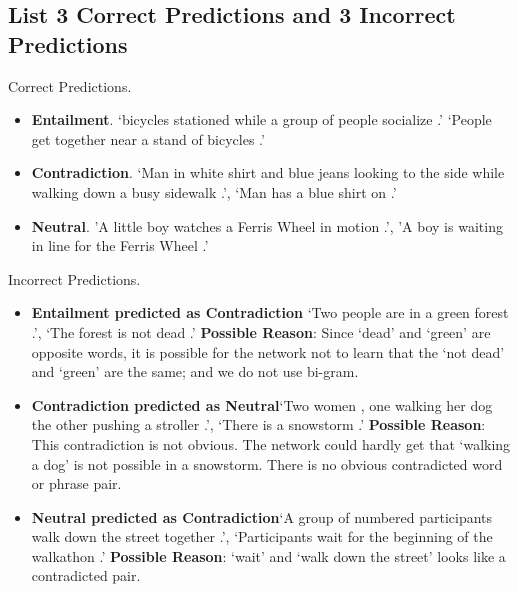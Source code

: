\documentclass[10pt,a4paper]{article}
\begin{document}
\subsection{List 3 Correct Predictions and 3 Incorrect Predictions}
Correct Predictions. 
\begin{itemize}
\item \textbf{Entailment}. `bicycles stationed while a group of people socialize .'
 `People get together near a stand of bicycles .'
\item \textbf{Contradiction}. `Man in white shirt and blue jeans looking to the side while walking down a busy sidewalk .',
 `Man has a blue shirt on .'
\item \textbf{Neutral}. 'A little boy watches a Ferris Wheel in motion .',
 'A boy is waiting in line for the Ferris Wheel .'
\end{itemize}
Incorrect Predictions. 
\begin{itemize}
\item \textbf{Entailment predicted as Contradiction} `Two people are in a green forest .', `The forest is not dead .' \textbf{Possible Reason}: Since `dead' and `green' are opposite words, it is possible for the network not to learn that the `not dead' and `green' are the same; and we do not use bi-gram.
\item \textbf{Contradiction predicted as Neutral}`Two women , one walking her dog the other pushing a stroller .', `There is a snowstorm .' \textbf{Possible Reason}: This contradiction is not obvious. The network could hardly get that `walking a dog' is not possible in a snowstorm. There is no obvious contradicted word or phrase pair.
\item \textbf{Neutral predicted as Contradiction}`A group of numbered participants walk down the street together .',
 `Participants wait for the beginning of the walkathon .' \textbf{Possible Reason}: `wait' and `walk down the street' looks like a contradicted pair. 
\end{itemize}
\end{document}
